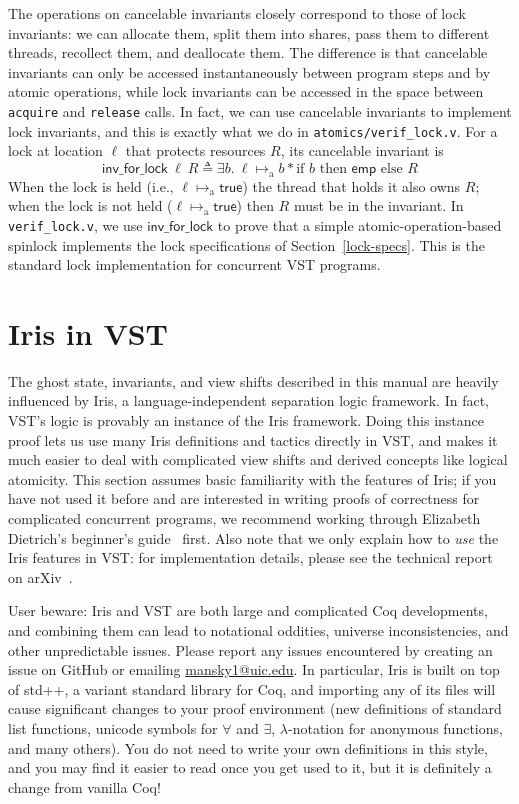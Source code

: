 \documentclass[11pt]{article}
\begin{document}
The operations on cancelable invariants closely correspond to those of lock invariants: we can allocate them, split them into shares, pass them to different threads, recollect them, and deallocate them. The difference is that cancelable invariants can only be accessed instantaneously between program steps and by atomic operations, while lock invariants can be accessed in the space between \texttt{acquire} and \texttt{release} calls. In fact, we can use cancelable invariants to implement lock invariants, and this is exactly what we do in \texttt{atomics/verif\_lock.v}. For a lock at location $\ell$ that protects resources $R$, its cancelable invariant is \[\mathsf{inv\_for\_lock}\ \ell\ R \triangleq \exists b.\ \ell \mapsto_{\mathrm{a}} b * \text{if } b \text{ then } \mathsf{emp} \text{ else } R\]
When the lock is held (i.e., $\ell \mapsto_{\mathrm{a}} \mathsf{true}$) the thread that holds it also owns $R$; when the lock is not held ($\ell \mapsto_{\mathrm{a}} \mathsf{true}$) then $R$ must be in the invariant. In \texttt{verif\_lock.v}, we use $\mathsf{inv\_for\_lock}$ to prove that a simple atomic-operation-based spinlock implements the lock specifications of Section~\ref{lock-specs}. This is the standard lock implementation for concurrent VST programs.

\section{Iris in VST}
The ghost state, invariants, and view shifts described in this manual are heavily influenced by Iris, a language-independent separation logic framework. In fact, VST's logic is provably an instance of the Iris framework. Doing this instance proof lets us use many Iris definitions and tactics directly in VST, and makes it much easier to deal with complicated view shifts and derived concepts like logical atomicity. This section assumes basic familiarity with the features of Iris; if you have not used it before and are interested in writing proofs of correctness for complicated concurrent programs, we recommend working through Elizabeth Dietrich's beginner's guide~\cite{iris-guide} first. Also note that we only explain how to \emph{use} the Iris features in VST: for implementation details, please see the technical report on arXiv~\cite{iris-vst-arxiv}.

User beware: Iris and VST are both large and complicated Coq developments, and combining them can lead to notational oddities, universe inconsistencies, and other unpredictable issues. Please report any issues encountered by creating an issue on GitHub or emailing \url{mansky1@uic.edu}. In particular, Iris is built on top of std++, a variant standard library for Coq, and importing any of its files will cause significant changes to your proof environment (new definitions of standard list functions, unicode symbols for $\forall$ and $\exists$, $\lambda$-notation for anonymous functions, and many others). You do not need to write your own definitions in this style, and you may find it easier to read once you get used to it, but it is definitely a change from vanilla Coq!
\end{document}
